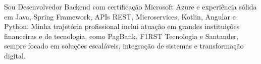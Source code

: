\documentclass[10pt,a4paper,ragged2e,withhyper]{altacv}
\newenvironment{sloppypar*}{\sloppy\ignorespaces}{\par}
\let\oldquote\quote
\let\endoldquote\endquote
\renewenvironment{quote}{\oldquote\color{body}}{\endoldquote}
\begin{document}
    \begin{paracol}{2}
          \bigskip
            \begin{sloppypar*}
            \end{sloppypar*}
          \bigskip
            \begin{sloppypar*}
            \end{sloppypar*}
          \bigskip
            \begin{sloppypar*}
            \end{sloppypar*}
          \bigskip
            \begin{sloppypar*}
            \end{sloppypar*}
          \bigskip
            \begin{sloppypar*}
            \end{sloppypar*}
          \bigskip
            \begin{sloppypar*}
            \end{sloppypar*}
        
            \bigskip

        \newpage
        
        \switchcolumn
        
            \begin{quote}
                 Sou Desenvolvedor Backend com certificação Microsoft Azure e experiência sólida em Java, Spring Framework, APIs REST, Microservices, Kotlin, Angular e Python. Minha trajetória profissional inclui atuação em grandes instituições financeiras e de tecnologia, como PagBank, F1RST Tecnologia e Santander, sempre focado em soluções escaláveis, integração de sistemas e transformação digital.
            \end{quote}
        

\end{paracol}
\end{document}
